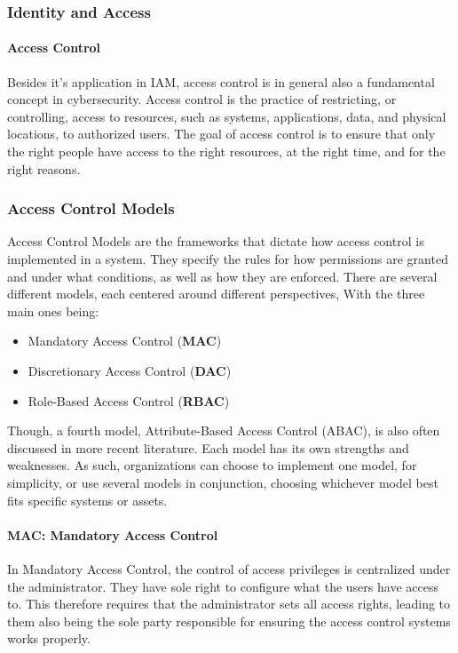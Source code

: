 \subsubsection{Identity and Access}
\paragraph{Access Control}
Besides it's application in IAM, access control is in general also a fundamental concept in cybersecurity. Access control is the practice of restricting, or controlling, access to resources, such as systems, applications, data, and physical locations, to authorized users. The goal of access control is to ensure that only the right people have access to the right resources, at the right time, and for the right reasons\citep{Gartner-DefIAM}.

\subsubsection{Access Control Models}
Access Control Models are the frameworks that dictate how access control is implemented in a system. They specify the rules for how permissions are granted and under what conditions, as well as how they are enforced. There are several different models, each centered around different perspectives, With the three main ones being:\citep{RountreeDerrick2010SfMW}

\begin{itemize}
	\item Mandatory Access Control (\textbf{MAC})
	\item Discretionary Access Control (\textbf{DAC})
	\item Role-Based Access Control (\textbf{RBAC})
\end{itemize}
Though, a fourth model, Attribute-Based Access Control (ABAC), is also often discussed in more recent literature.
Each model has its own strengths and weaknesses. As such, organizations can choose to implement one model, for simplicity, or use several models in conjunction, choosing whichever model best fits specific systems or assets.

\paragraph{MAC: Mandatory Access Control}
In Mandatory Access Control, the control of access privileges is centralized under the administrator. They have sole right to configure what the users have access to. This therefore requires that the administrator sets all access rights, leading to them also being the sole party responsible for ensuring the access control systems works properly.

